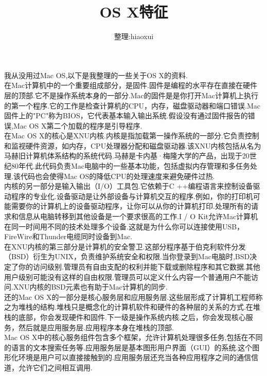 \documentclass[a4paper,12pt,notitlepage]{article}
\begin{document}
\title{OS X特征}
\author{整理:hiaoxui}
\maketitle

	我从没用过Mac OS,以下是我整理的一些关于OS X的资料. \\

	在Mac计算机中的一个重要组成部分，是固件.固件是编程的水平存在直接在硬件层的顶部.它不是操作系统本身的一部分.Mac的固件是是你打开Mac计算机上执行的第一个程序.它的工作是检查计算机的CPU，内存，磁盘驱动器和端口错误.Mac固件上的"PC"称为BIOS，它代表基本输入输出系统.假设没有通过固件报告的错误,Mac OS X第二个加载的程序是引导程序. \\
	
	在Mac OS X的核心是XNU内核.内核是指加载第一操作系统的一部分.它负责控制和监视硬件资源，如内存，CPU处理器分配和磁盘驱动器.该XNU内核包括从名为马赫旧计算机体系结构的系统代码.马赫是卡内基·梅隆大学的产品，出现于20世纪80年代.此代码负责Mac电脑中的一些基本功能，包括虚拟内存管理和多任务处理.该代码也会使得Mac OS的降低CPU的处理速度来避免硬件过热. \\
	
	内核的另一部分是输入输出（I/O）工具包.它依赖于C ++编程语言来控制设备驱动程序的专业化.设备驱动是让外部设备与计算机交互的程序.例如，你的打印机可能需要你的计算机上的设备驱动程序，让你可以从你的计算机打印.处理所有的请求和信息从电脑转移到其他设备是一个要求很高的工作.I / O Kit允许Mac计算机在同一时间用不同的技术处理多个设备.这就是为什么你可以连接使用USB，FireWire和Thunder电缆同时设备到Mac. \\
	
	在XNU内核的第三部分是计算机的安全警卫.这部分程序基于伯克利软件分发（BSD）衍生为UNIX，负责维护系统安全和权限.当你登录到Mac电脑时,BSD决定了你的访问级别.管理员有自由支配的权利并能下载或删除程序和其它数据.其他用户级别可能没有这样的自由权限.管理员可以定义什么内容一个普通用户不能访问.XNU内核的BSD元素也有助于Mac计算机的同步. \\
	
	还的Mac OS X的一部分是核心服务层和应用服务层.这些层形成了计算机工程师称之为堆栈的结构.堆栈只是概念化的计算机软件和硬件的各种层的关系的方式.在堆栈的底部，你会发现硬件和固件.下一级是操作系统内核.之后，你会发现核心服务，然后就是应用服务层.应用程序本身在堆栈的顶部. \\

	Mac OS X中的核心服务组件包含多个框架，允许计算机处理很多任务,包括在不同的语言的文本搜索任务等.应用服务层是基本图形用户界面（GUI）的系统.这个图形化环境是用户可以直接接触到的.应用服务层还充当各种应用程序之间的通信信道，允许它们之间相互调用. \\
	
\end{document}
